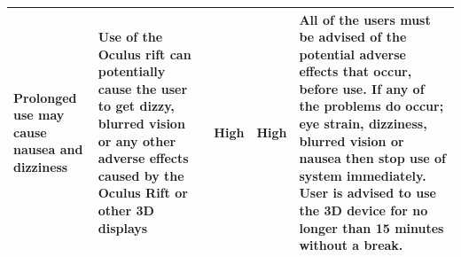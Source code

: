 \documentclass[12pt]{article} %
\begin{document}
\begin{flushleft}
\begin{supertabular}{ p{2.5cm}>{\arraybackslash}p{3.75cm} p{1.75cm} p{1.75cm} p{5cm} }
Prolonged use may cause nausea and dizziness & Use of the Oculus rift can potentially cause the user to get dizzy, blurred vision or any other adverse effects caused by the Oculus Rift or other 3D displays & High  & High & All of the users must be advised of the potential adverse effects that occur, before use. If any of the problems do occur; eye strain, dizziness, blurred vision or nausea then stop use of system immediately. User is advised to use the 3D device for no longer than 15 minutes without a break. \\ \midrule
\end{supertabular}


\end{flushleft}
\end{document}
